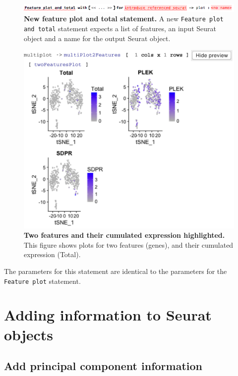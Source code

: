 \begin{figure}[h!tbp]
  \centering
    \includegraphics[width=\figWidthWide]{figures/FeaturesPlotTotal.png}
    \caption[New feature plot and total statement.]{\textbf{New feature plot and total statement.} A new
    \texttt{Feature plot and total} statement expects a list of features, an input Seurat object
    and a name for the output Seurat object.}
\label{fig:FeaturesPlotTotal}
\end{figure}

\begin{figure}[h!tbp]
  \centering
    \includegraphics[width=\figWidthWide]{figures/TwoFeaturesPlot.pdf}
    \caption[Two features and their cumulated expression highlighted.]{\textbf{Two features
    and their cumulated expression highlighted.} This figure shows plots for two features (genes),
    and their cumulated expression (Total).}
\label{fig:TwoFeaturesPlot}
\end{figure}

The parameters for this statement are identical to the parameters for the \texttt{Feature plot}
statement.

\section{Adding information to Seurat objects}
\subsection{Add principal component information}
